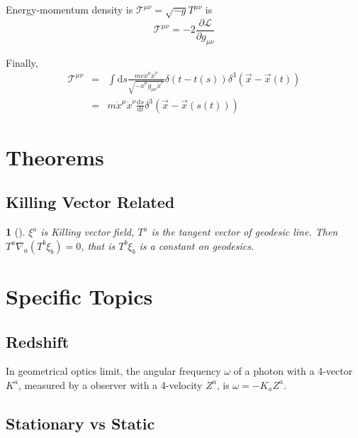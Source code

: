 \documentclass[12pt,a4paper]{book}
\begin{document}
Energy-momentum density is $\mathcal T^{\mu\nu} = \sqrt{-g}T^{\mu\nu}$ is
\begin{equation} 
\mathcal T^{\mu\nu} = -2 \frac{\partial \mathcal L}{\partial g_{\mu\nu}}
\end{equation}

Finally,
\begin{eqnarray}
\mathcal T^{\mu\nu} &=& \int \mathrm ds \frac{mc\dot x^\mu \dot x^\nu}{\sqrt{-\dot x^\mu g_{\mu\nu} \dot x^\nu}} \delta(t-t(s))\delta^3(\vec x - \vec x(t)) \\
&=& m\dot x^\mu \dot x^\nu \frac{\mathrm d s}{\mathrm d t} \delta^3(\vec x - \vec x(s(t)))
\end{eqnarray}





\section{Theorems}

\subsection{Killing Vector Related}

\newtheorem{theorem}{}[chapter]

\begin{theorem}[]
$\xi^a$ is Killing vector field, $T^a$ is the tangent vector of geodesic line. Then $T^a\nabla_a(T^b\xi_b)=0$, that is $T^b\xi_b$ is a constant on geodesics.
\end{theorem}





\section{Specific Topics}
\subsection{Redshift}

In geometrical optics limit, the angular frequency $\omega$ of a photon with a 4-vector $K^a$, measured by a observer with a 4-velocity $Z^a$, is $\omega=-K_aZ^a$.

\subsection{Stationary vs Static}
\end{document}
